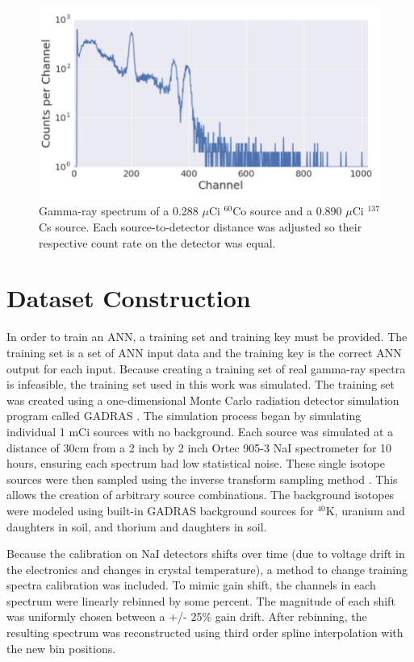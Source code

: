 \documentclass[tocnosub,noragright,centerchapter,12pt,fullpage]{uiucecethesis09}
\begin{document}
\begin{figure}[H]
    \centering
    \includegraphics[width=0.7\linewidth]{images/CoCs_mix}
    \caption{Gamma-ray spectrum of a 0.288 $\mu$Ci $^{60}$Co source and a 0.890 $\mu$Ci $^{137}$Cs source. Each source-to-detector distance was adjusted so their respective count rate on the detector was equal.}
    \label{fig:top_five}
\end{figure}


\section{Dataset Construction}

In order to train an ANN, a training set and training key must be provided. The training set is a set of ANN input data and the training key is the correct ANN output for each input. Because creating a training set of real gamma-ray spectra is infeasible, the training set used in this work was simulated. The training set was created using a one-dimensional Monte Carlo radiation detector simulation program called GADRAS \cite{mitchell2014}. The simulation process began by simulating individual 1 mCi sources with no background. Each source was simulated at a distance of 30cm from a 2 inch by 2 inch Ortec 905-3 NaI spectrometer for 10 hours, ensuring each spectrum had low statistical noise. These single isotope sources were then sampled using the inverse transform sampling method \cite{Devroyne}. This allows the creation of arbitrary source combinations. The background isotopes were modeled using built-in GADRAS background sources for $^{40}$K, uranium and daughters in soil, and thorium and daughters in soil.

Because the calibration on NaI detectors shifts over time (due to voltage drift in the electronics and changes in crystal temperature), a method to change training spectra calibration was included. To mimic gain shift, the channels in each spectrum were linearly rebinned by some percent. The magnitude of each shift was uniformly chosen between a +/- 25\% gain drift. After rebinning, the resulting spectrum was reconstructed using third order spline interpolation with the new bin positions.
\end{document}
